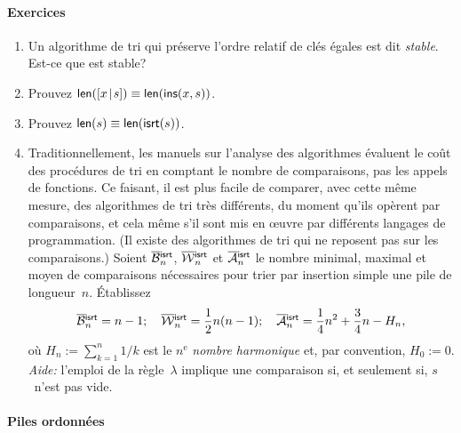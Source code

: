 \paragraph{Exercices}
\begin{enumerate}

  \item Un algorithme de tri qui préserve l'ordre relatif de clés
    égales est dit \emph{stable}. Est-ce que
     est stable?

  \item Prouvez \(\textsf{len}([{x}\!\mid\!{s}]) \equiv
    \textsf{len}(\textsf{ins}(x,s))\).

  \item Prouvez \(\textsf{len}(s) \equiv \textsf{len}(\textsf{isrt}(s))\).

  \item Traditionnellement, les manuels sur l'analyse des algorithmes
    évaluent le coût des procédures de tri en comptant le nombre de
    comparaisons, pas les appels de fonctions. Ce faisant, il est plus
    facile de comparer, avec cette même mesure, des algorithmes de tri
    très différents, du moment qu'ils opèrent par comparaisons, et
    cela même s'il sont mis en {\oe}uvre par différents langages de
    programmation. (Il existe des algorithmes de tri qui ne reposent
    pas sur les comparaisons.) Soient
    \(\OB{\fun{isrt}}{n}\),
    \(\OW{\fun{isrt}}{n}\) et
    \(\OM{\fun{isrt}}{n}\) le
    nombre minimal, maximal et moyen de comparaisons nécessaires pour
    trier par insertion simple une pile de longueur~\(n\). Établissez
    \begin{equation*}
      \OB{\fun{isrt}}{n} = n - 1; \quad
      \OW{\fun{isrt}}{n} = \frac{1}{2}n(n - 1); \quad
      \OM{\fun{isrt}}{n} = \frac{1}{4}n^2 + \frac{3}{4}n - H_n,
    \end{equation*}
    où \(H_n := \sum_{k=1}^n{1/k}\) est le \(n^\text{e}\) \emph{nombre
      harmonique} et, par convention,
    \(H_0 := 0\). \emph{Aide:} l'emploi de la règle~\(\lambda\)
    implique une comparaison si, et seulement si, \(s\)~n'est pas
    vide.
\end{enumerate}

\paragraph{Piles ordonnées}

